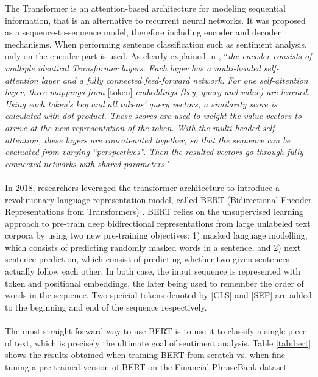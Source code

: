 \documentclass[final]{cvpr}
\begin{document}
The Transformer \cite{transformer} is an attention-based architecture for modeling sequential information, that is an alternative to recurrent neural networks. It was proposed as a sequence-to-sequence model, therefore including encoder and decoder mechanisms. When performing sentence classification such as sentiment analysis, only on the encoder part is used. As clearly explained in \cite{FinBERT}, “\textit{the encoder consists of multiple identical Transformer layers. Each layer has a multi-headed self-attention layer and a fully connected feed-forward network. For one self-attention layer, three mappings from} {[token]} \textit{embeddings (key, query and value) are learned. Using each token’s key and all tokens’ query vectors, a similarity score is calculated with dot product. These scores are used to weight the value vectors to arrive at the new representation of the token. With the multi-headed self-attention, these layers are concatenated together, so that the sequence can be evaluated from varying “perspectives". Then the resulted vectors go through fully connected networks with shared parameters.}"\\
\\	
In 2018, researchers leveraged the transformer architecture to introduce a revolutionary language representation model, called BERT (Bidirectional Encoder Representations from Transformers) \cite{BERT}. BERT relies on the unsupervised learning approach to pre-train deep bidirectional representations from large unlabeled text corpora by using two new pre-training objectives: 1) masked language modelling, which consists of predicting randomly masked words in a sentence, and 2) next sentence prediction, which consist of predicting whether two given sentences actually follow each other. In both case, the input sequence is represented with token and positional embeddings, the later being used to remember the order of words in the sequence. Two speicial tokens denoted by [CLS] and [SEP] are added to the beginning and end of the sequence respectively.\\
\\
The most straight-forward way to use BERT is to use it to classify a single piece of text, which is precisely the ultimate goal of sentiment analysis. Table \ref{tab:bert} shows the results obtained when training BERT from scratch vs. when fine-tuning a pre-trained version of BERT on the Financial PhraseBank dataset. 
\end{document}
